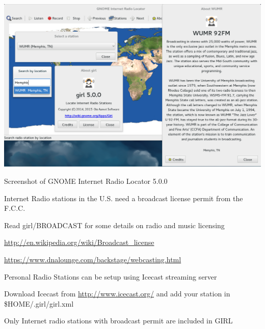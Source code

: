 \documentclass[20pt,landscape]{foils}
\begin{document}

\begin{center}
  \colorbox{white}{\includegraphics[width=0.6\hsize]{../data/screenshot.png}}  
  
  {\blueem Screenshot of GNOME Internet Radio Locator 5.0.0}
\end{center}


\begin{list1}
  \item Internet Radio stations in the U.S. need a broadcast license permit from the F.C.C.
    \begin{list2}
    \item Read girl/BROADCAST for some details on radio and music licensing
    \item \url{http://en.wikipedia.org/wiki/Broadcast_license}
    \item \url{https://www.dnalounge.com/backstage/webcasting.html}
    \end{list2}
  \item Personal Radio Stations can be setup using Icecast streaming server
    \begin{list2}
    \item Download Icecast from \url{http://www.icecast.org/} and add your station in \$HOME/.girl/girl.xml
    \end{list2}
  \item Only Internet radio stations with broadcast permit are included in GIRL
\end{list1}

\end{document}
